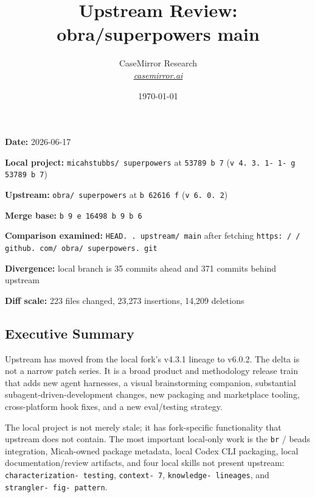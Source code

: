 \documentclass[twocolumn,10pt,letterpaper]{article}
\title{\vspace{-2.3em}\Large\bfseries\color{titlebg} Upstream Review: obra/superpowers main\vspace{-0.6em}}
\author{\normalsize CaseMirror Research \\ \footnotesize\itshape\href{https://casemirror.ai}{\textcolor{headergray}{casemirror.ai}}}
\date{{\footnotesize\color{headergray} \today}}
\begin{document}
\maketitle
\thispagestyle{firstpage}
\vspace{-0.95em}


\textbf{Date:} 2026-06-17

\textbf{Local project:} \texttt{micahstubbs/ superpowers} at \texttt{53789 b 7} (\texttt{v 4. 3. 1- 1- g 53789 b 7})

\textbf{Upstream:} \texttt{obra/ superpowers} at \texttt{b 62616 f} (\texttt{v 6. 0. 2})

\textbf{Merge base:} \texttt{b 9 e 16498 b 9 b 6}

\textbf{Comparison examined:} \texttt{HEAD. . upstream/ main} after fetching \texttt{https: / / github. com/ obra/ superpowers. git}

\textbf{Divergence:} local branch is 35 commits ahead and 371 commits behind upstream

\textbf{Diff scale:} 223 files changed, 23,273 insertions, 14,209 deletions


\subsection{Executive Summary}

Upstream has moved from the local fork's v4.3.1 lineage to v6.0.2. The delta is not a narrow patch series. It is a broad product and methodology release train that adds new agent harnesses, a visual brainstorming companion, substantial subagent-driven-development changes, new packaging and marketplace tooling, cross-platform hook fixes, and a new eval/testing strategy.


The local project is not merely stale; it has fork-specific functionality that upstream does not contain. The most important local-only work is the \texttt{br} / beads integration, Micah-owned package metadata, local Codex CLI packaging, local documentation/review artifacts, and four local skills not present upstream: \texttt{characterization- testing}, \texttt{context- 7}, \texttt{knowledge- lineages}, and \texttt{strangler- fig- pattern}.
\end{document}
